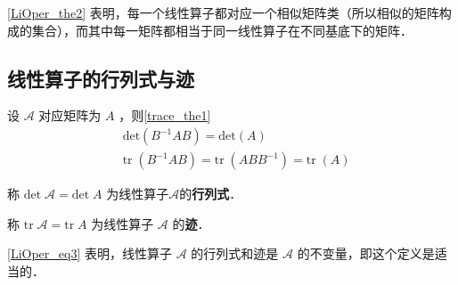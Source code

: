\autoref{LiOper_the2} 表明，每一个线性算子都对应一个相似矩阵类（所以相似的矩阵构成的集合），而其中每一矩阵都相当于同一线性算子在不同基底下的矩阵．
\subsection{线性算子的行列式与迹}\label{LiOper_sub2}
设 $\mathcal{A}$ 对应矩阵为 $A$ ，则\autoref{trace_the1}~ 
\begin{equation}\label{LiOper_eq3}
\begin{aligned}
&\mathrm{det}(B^{-1}AB)=\mathrm{det}(A)\\
&\mathrm{tr}\;(B^{-1}AB)=\mathrm{tr}\;(ABB^{-1})=\mathrm{tr}\;(A)
\end{aligned}
\end{equation}
\begin{definition}{}
称
$
\mathrm{det}\;\mathcal{A}=\mathrm{det}\;A
$
为线性算子$\mathcal{A}$的\textbf{行列式}．

称
$
\mathrm{tr}\;\mathcal{A}=\mathrm{tr}\;A
$
为线性算子 $\mathcal{A}$ 的\textbf{迹}．
\end{definition}
\autoref{LiOper_eq3} 表明，线性算子 $\mathcal{A}$ 的行列式和迹是 $\mathcal{A}$ 的不变量，即这个定义是适当的．
